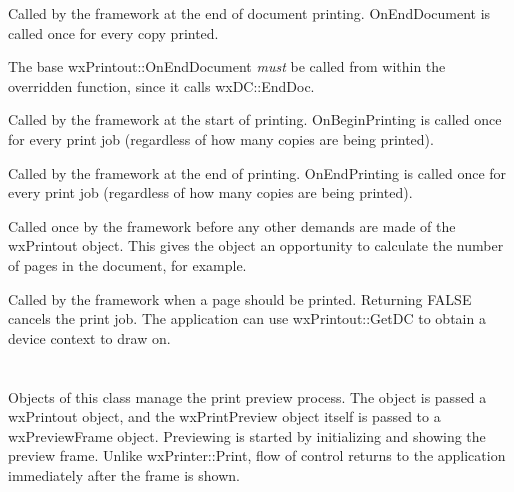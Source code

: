 
\label{wxprintoutonenddocument}


Called by the framework at the end of document printing. OnEndDocument
is called once for every copy printed.

The base wxPrintout::OnEndDocument {\it must} be called
from within the overridden function, since it calls wxDC::EndDoc.

\label{wxprintoutonbeginprinting}


Called by the framework at the start of printing. OnBeginPrinting is called once for every
print job (regardless of how many copies are being printed).

\label{wxprintoutonendprinting}


Called by the framework at the end of printing. OnEndPrinting
is called once for every print job (regardless of how many copies are being printed).

\label{wxprintoutonprepareprinting}


Called once by the framework before any other demands are made of the
wxPrintout object. This gives the object an opportunity to calculate the
number of pages in the document, for example.

\label{wxprintoutonprintpage}


Called by the framework when a page should be printed. Returning FALSE cancels
the print job. The application can use wxPrintout::GetDC to obtain a device
context to draw on.

\section{}\label{wxprintpreview}

Objects of this class manage the print preview process. The object is passed
a wxPrintout object, and the wxPrintPreview object itself is passed to
a wxPreviewFrame object. Previewing is started by initializing and showing
the preview frame. Unlike wxPrinter::Print, flow of control returns to the application
immediately after the frame is shown.

